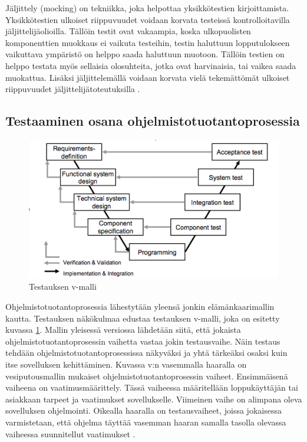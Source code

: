 Jäljittely (mocking) on tekniikka, joka helpottaa yksikkötestien kirjoittamista. Yksikkötestien ulkoiset riippuvuudet voidaan korvata testeissä kontrolloitavilla jäljittelijäolioilla. Tällöin testit ovat vakaampia, koska ulkopuolisten komponenttien muokkaus ei vaikuta testeihin, testin haluttuun lopputulokseen vaikuttava ympäristö on helppo saada haluttuun muotoon. Tällöin testien on helppo testata myös sellaisia olosuhteita, jotka ovat harvinaisia, tai vaikea saada muokattua. Lisäksi jäljittelemällä voidaan korvata vielä tekemättömät ulkoiset riippuvuudet jäljittelijätoteutuksilla \cite{mocking}.

\subsection{Testaaminen osana ohjelmistotuotantoprosessia}

\begin{figure}[htb]
\includegraphics[width=130mm]{v_model.png}
\caption{Testauksen v-malli} \label{v_model}
\end{figure}

Ohjelmistotuotantoprosessia lähestytään yleensä jonkin elämänkaarimallin kautta. Testauksen näkökulmaa edustaa testauksen v-malli, joka on esitetty kuvassa \ref{v_model}. Mallin yleisessä versiossa lähdetään siitä, että jokaista ohjelmistotuotantoprosessin vaihetta vastaa jokin testausvaihe. Näin testaus tehdään ohjelmistotuotantoprosessissa näkyväksi ja yhtä tärkeäksi osaksi kuin itse sovelluksen kehittäminen. Kuvassa v:n vasemmalla haaralla on vesiputousmallin mukaiset ohjelmistotuotantoprosessin vaiheet. Ensimmäisenä vaiheena on vaatimusmäärittely. Tässä vaiheessa määritellään loppukäyttäjän tai asiakkaan tarpeet ja vaatimukset sovellukselle.  Viimeinen vaihe on alimpana oleva sovelluksen ohjelmointi. Oikealla haaralla on testausvaiheet, joissa jokaisessa varmistetaan, että ohjelma täyttää vasemman haaran samalla tasolla olevassa vaiheessa suunnitellut vaatimukset \cite[39-42]{testing_foundations}.


